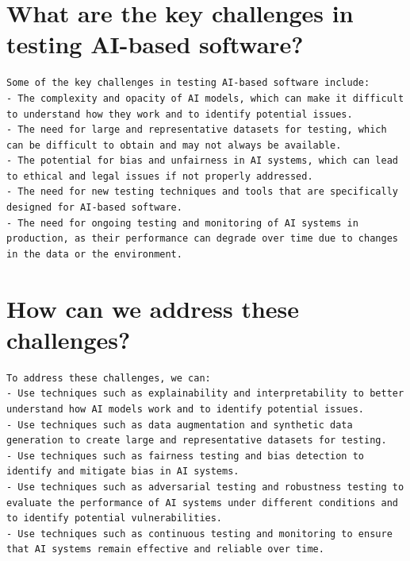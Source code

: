 \documentclass[
  letterpaper,
  DIV=11,
  numbers=noendperiod,
  oneside]{scrreprt}
\begin{document}
\section*{What are the key challenges in testing AI-based
software?}\label{what-are-the-key-challenges-in-testing-ai-based-software}


\begin{verbatim}
Some of the key challenges in testing AI-based software include:
- The complexity and opacity of AI models, which can make it difficult to understand how they work and to identify potential issues.
- The need for large and representative datasets for testing, which can be difficult to obtain and may not always be available.
- The potential for bias and unfairness in AI systems, which can lead to ethical and legal issues if not properly addressed.
- The need for new testing techniques and tools that are specifically designed for AI-based software.
- The need for ongoing testing and monitoring of AI systems in production, as their performance can degrade over time due to changes in the data or the environment.
\end{verbatim}

\section*{How can we address these
challenges?}\label{how-can-we-address-these-challenges}


\begin{verbatim}
To address these challenges, we can:
- Use techniques such as explainability and interpretability to better understand how AI models work and to identify potential issues.
- Use techniques such as data augmentation and synthetic data generation to create large and representative datasets for testing.
- Use techniques such as fairness testing and bias detection to identify and mitigate bias in AI systems.
- Use techniques such as adversarial testing and robustness testing to evaluate the performance of AI systems under different conditions and to identify potential vulnerabilities.
- Use techniques such as continuous testing and monitoring to ensure that AI systems remain effective and reliable over time.
\end{verbatim}
\end{document}
